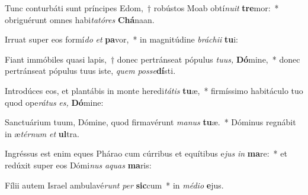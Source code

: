 \item Tunc conturbáti sunt príncipes Edom,~† robústos Moab obtí\textit{nuit} \textbf{tre}mor:~* obriguérunt omnes habi\textit{tatóres} \textbf{Chá}naan.
\item Irruat super eos formí\textit{do}\hspace{0.02em} \textit{et} \textbf{pa}vor,~* in magnitúdine \textit{bráchii} \textbf{tu}i:
\item Fiant immóbiles quasi lapis,~† donec pertránseat pópulus \textit{tuus,} \textbf{Dó}mine,~* donec pertránseat pópulus tuus iste, \textit{quem} \textit{posse}\textbf{dí}sti.
\item Introdúces eos, et plantábis in monte heredi\textit{tátis} \textbf{tu}æ,~* firmíssimo habitáculo tuo quod ope\textit{rátus} \textit{es,} \textbf{Dó}mine:
\item Sanctuárium tuum, Dómine, quod firmavérunt \textit{manus} \textbf{tu}æ.~* Dóminus regnábit in æ\textit{térnum} \textit{et} \textbf{ul}tra.
\item Ingréssus est enim eques Phárao cum cúrribus et equítibus e\textit{jus} \textit{in} \textbf{ma}re:~* et redúxit super eos Dómi\textit{nus} \textit{aquas} \textbf{ma}ris:
\item Fílii autem Israel ambulavé\textit{runt} \textit{per} \textbf{sic}cum~* in \textit{médio} \textbf{e}jus.
